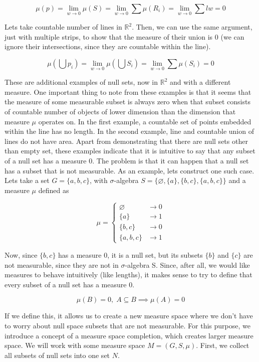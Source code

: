 \documentclass{article}
\begin{document}
\[\mu(p)=\lim_{w \to 0}\mu(S)=\lim_{w \to 0}\sum\mu(R_i)=\lim_{w \to 0}\sum lw=0\]

Lets take countable number of lines in $\mathbb{R}^2$. Then, we can use the same argument, just with multiple strips, to show that the measure of their union is 0 (we can ignore their intersections, since they are countable within the line).

\[ \mu(\bigcup p_i) = \lim_{w \to 0}\mu(\bigcup S_i) = \lim_{w \to 0}\sum\mu(S_i) = 0 \]

These are additional examples of null sets, now in $\mathbb{R}^2$ and with a different measure. One important thing to note from these examples is that it seems that the measure of some measurable subset is always zero when that subset consists of countable number of objects of lower dimension than the dimension that measure $\mu$ operates on. In the first example, a countable set of points embedded within the line has no length. In the second example, line and countable union of lines do not have area. 
\newline\indent Apart from demonstrating that there are null sets other than empty set, these examples indicate that it is intuitive to say that any subset of a null set has a measure 0. The problem is that it can happen that a null set has a subset that is not measurable. As an example, lets construct one such case. Lets take a set $G=\{a,b,c\}$, with $\sigma$-algebra $S=\{\varnothing, \{a\},\{b,c\},\{a,b,c\}\}$ and a measure $\mu$ defined as

\[\mu=\begin{cases}
    \varnothing & \to 0 \\
    \{a\} & \to 1 \\
    \{b,c\} & \to 0 \\
    \{a,b,c\} & \to 1
\end{cases}\]

Now, since $\{b,c\}$ has a measure 0, it is a null set, but its subsets $\{b\}$ and $\{c\}$ are not measurable, since they are not in $\sigma$-algebra S. Since, after all, we would like measures to behave intuitively (like lengths), it makes sense to try to define that every subset of a null set has a measure 0.

\[ \mu(B)=0,\;A \subseteq B \implies \mu(A)=0 \]

If we define this, it allows us to create a new measure space where we don't have to worry about null space subsets that are not measurable. For this purpose, we introduce a concept of a measure space completion, which creates larger measure space. We will work with some measure space $M=(G,S,\mu)$. First, we collect all subsets of null sets into one set $N$.
\end{document}
